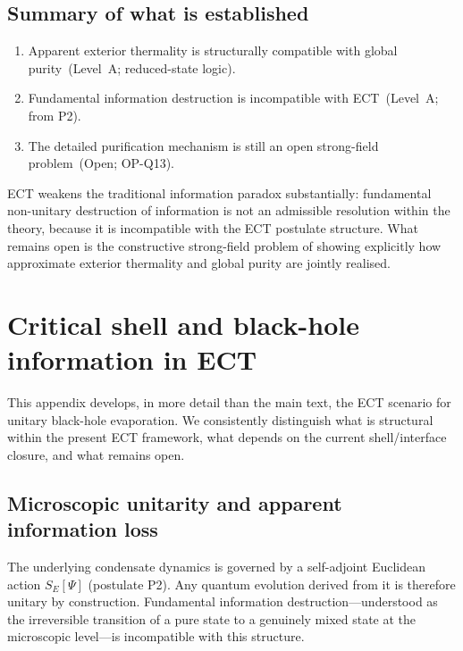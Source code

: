 \documentclass[11pt,a4paper]{article}
\numberwithin{equation}{section}
\begin{document}
\subsection*{Summary of what is established}

\begin{enumerate}[label=(\roman*)]
  \item Apparent exterior thermality is structurally compatible with
    global purity~(Level~A; reduced-state logic).
  \item Fundamental information destruction is incompatible with
    ECT~(Level~A; from P2).
  \item The detailed purification mechanism is still an open strong-field
    problem~(Open; OP-Q13).
\end{enumerate}

ECT weakens the traditional information paradox substantially:
fundamental non-unitary destruction of information is not an admissible
resolution within the theory, because it is incompatible with the ECT
postulate structure.
What remains open is the constructive strong-field problem of showing
explicitly how approximate exterior thermality and global purity are
jointly realised.

\section{Critical shell and black-hole information in ECT}
\label{app:bh_info}

This appendix develops, in more detail than the main text, the ECT scenario
for unitary black-hole evaporation.
We consistently distinguish what is structural within the present ECT
framework, what depends on the current shell/interface closure, and what
remains open.

\subsection{Microscopic unitarity and apparent information loss}
\label{app:bh_unitarity}

The underlying condensate dynamics is governed by a self-adjoint Euclidean
action $S_E[\Psi]$ (postulate P2).
Any quantum evolution derived from it is therefore unitary by construction.
Fundamental information destruction---understood as the irreversible transition
of a pure state to a genuinely mixed state at the microscopic level---is
incompatible with this structure.
\end{document}
